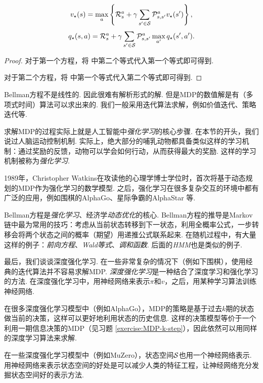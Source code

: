 \begin{theorem}[Bellman方程]
\[v_\star(s) = \max_a\left\{\mathcal R_s^a + \gamma \sum_{s'\in \mathcal S}\mathcal P_{s,s'}^av_\star(s')\right\},\]
\[q_\star(s,a) = \mathcal R_s^a+\gamma \sum_{s'\in \mathcal S}\mathcal P_{s,s'}^a\max_{a'}q_\star(s',a').\]
\end{theorem}
\begin{proof}
    对于第一个方程，将 中第二个等式代入第一个等式即可得到. 

    对于第二个方程，将 中第一个等式代入第二个等式即可得到. 
\end{proof}

Bellman方程不是线性的. 因此很难有解析形式的解. 但是MDP的数值解是有（多项式时间）算法可以求出来的. 我们一般采用迭代算法求解，例如价值迭代、策略迭代等.

求解MDP的过程实际上就是人工智能中\textit{强化学习}的核心步骤. 在本节的开头，我们说过人脑运动控制机制. 实际上，绝大部分的哺乳动物都具备类似这样的学习机制：通过奖励的反馈，动物可以学会如何行动，从而获得最大的奖励. 这样的学习机制被称为\textit{强化学习}. 

1989年，Christopher Watkins在攻读他的心理学博士学位时，首次将基于动态规划的MDP作为强化学习的数学模型. 之后，强化学习在很多复杂交互的环境中都有广泛的应用，例如围棋的AlphaGo、星际争霸的AlphaStar 等.

\begin{remark}
Bellman方程是\textit{强化学习}、经济学\textit{动态优化}的核心. Bellman方程的推导是Markov链中最为常用的技巧：考虑从当前状态转移到下一状态，利用全概率公式，一步转移会将两个状态之间的概率（期望）用递推公式联系起来. 在随机过程中，有大量这样的例子：\textit{前向方程}、\textit{Wald等式}、\textit{调和函数}. 后面的\textit{HMM}也是类似的例子.    
\end{remark}

最后，我们谈谈深度强化学习. 在一些非常复杂的情况下（例如下围棋），使用经典的迭代算法并不容易求解MDP. \textit{深度强化学习}是一种结合了深度学习和强化学习的方法. 在深度强化学习中，用神经网络来表示$\pi$和$v$，之后，用某种学习算法训练神经网络. 

在很多深度强化学习模型中（例如AlphaGo），MDP的策略是基于过去$k$期的状态做当前的决策，这样可以更好地利用状态的历史信息. 这样的决策模型等价于一个利用一期信息决策的MDP（见习题 \ref{exercise:MDP-k-step}），因此依然可以用同样的深度学习算法来求解. 

在一些深度强化学习模型中（例如MuZero），状态空间$\mathcal S$也用一个神经网络表示. 用神经网络来表示状态空间的好处是可以减少人类的特征工程，让神经网络充分发掘状态空间好的表示方法.

